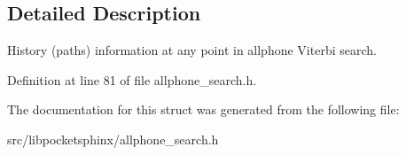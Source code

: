 \subsection{Detailed Description}
History (paths) information at any point in allphone Viterbi search. 

Definition at line 81 of file allphone\-\_\-search.\-h.



The documentation for this struct was generated from the following file\-:\begin{DoxyCompactItemize}
\item 
src/libpocketsphinx/allphone\-\_\-search.\-h\end{DoxyCompactItemize}
